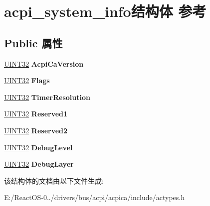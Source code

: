 \hypertarget{structacpi__system__info}{}\section{acpi\+\_\+system\+\_\+info结构体 参考}
\label{structacpi__system__info}
\subsection*{Public 属性}
\begin{DoxyCompactItemize}
\item 
\mbox{\label{structacpi__system__info_a7ebba0409f84673eb48c98663017c42d}} 
\hyperlink{_processor_bind_8h_ae1e6edbbc26d6fbc71a90190d0266018}{U\+I\+N\+T32} {\bfseries Acpi\+Ca\+Version}
\item 
\mbox{\label{structacpi__system__info_aaf337fdee800d18938bce8d5d96d1aad}} 
\hyperlink{_processor_bind_8h_ae1e6edbbc26d6fbc71a90190d0266018}{U\+I\+N\+T32} {\bfseries Flags}
\item 
\mbox{\label{structacpi__system__info_a7eba1664a860433e1016d84c8076b8c0}} 
\hyperlink{_processor_bind_8h_ae1e6edbbc26d6fbc71a90190d0266018}{U\+I\+N\+T32} {\bfseries Timer\+Resolution}
\item 
\mbox{\label{structacpi__system__info_afe3b572b4e1054eb10d0519a4bb6d535}} 
\hyperlink{_processor_bind_8h_ae1e6edbbc26d6fbc71a90190d0266018}{U\+I\+N\+T32} {\bfseries Reserved1}
\item 
\mbox{\label{structacpi__system__info_a5439d28e2bf6a1243cf9910695ab1524}} 
\hyperlink{_processor_bind_8h_ae1e6edbbc26d6fbc71a90190d0266018}{U\+I\+N\+T32} {\bfseries Reserved2}
\item 
\mbox{\label{structacpi__system__info_adaebc28dd3d98d1bd8c2fa604966fe6a}} 
\hyperlink{_processor_bind_8h_ae1e6edbbc26d6fbc71a90190d0266018}{U\+I\+N\+T32} {\bfseries Debug\+Level}
\item 
\mbox{\label{structacpi__system__info_abcdf564baf1d8bed2c2ad828c10ad51b}} 
\hyperlink{_processor_bind_8h_ae1e6edbbc26d6fbc71a90190d0266018}{U\+I\+N\+T32} {\bfseries Debug\+Layer}
\end{DoxyCompactItemize}


该结构体的文档由以下文件生成\+:\begin{DoxyCompactItemize}
\item 
E\+:/\+React\+O\+S-\/0../drivers/bus/acpi/acpica/include/actypes.\+h\end{DoxyCompactItemize}
